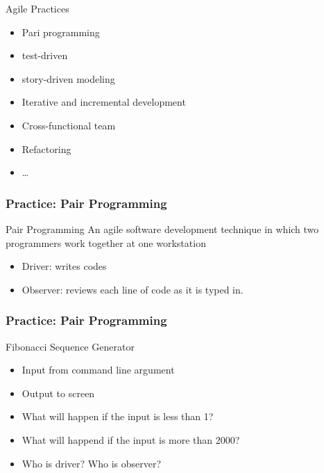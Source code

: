 \documentclass[UTF8]{beamer}
\begin{document}
\begin{frame}
  \begin{block}{Agile Practices}
    \begin{itemize}
      \item Pari programming
      \item test-driven
      \item story-driven modeling
      \item Iterative and incremental development
      \item Cross-functional team
      \item Refactoring
      \item \ldots
    \end{itemize}
  \end{block}
\end{frame}

\begin{frame}
  \frametitle{Practice: Pair Programming}
  \begin{block}{Pair Programming}
    An agile software development technique in which two programmers work together
    at one workstation
    \begin{itemize}
      \item Driver: writes codes
      \item Observer: reviews each line of code as it is typed in.
    \end{itemize}
  \end{block}
\end{frame}


\begin{frame}
  \frametitle{Practice: Pair Programming}
  \begin{block}{Fibonacci Sequence Generator}
    \begin{itemize}
      \item Input from command line argument
      \item Output to screen
      \item What will happen if the input is less than 1?
      \item What will happend if the input is more than 2000?
      \item Who is driver? Who is observer?
    \end{itemize}
  \end{block}
\end{frame}
\end{document}
